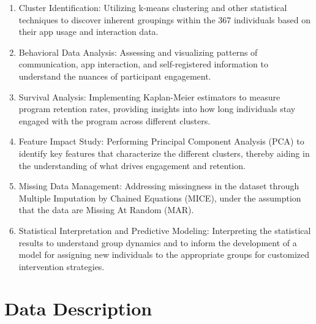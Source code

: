 \documentclass[12pt]{article}
\begin{document}
\begin{enumerate}
  \item Cluster Identification: Utilizing k-means clustering and other statistical techniques to discover inherent groupings within the 367 individuals based on their app usage and interaction data.

  \item Behavioral Data Analysis: Assessing and visualizing patterns of communication, app interaction, and self-registered information to understand the nuances of participant engagement.

  \item Survival Analysis: Implementing Kaplan-Meier estimators to measure program retention rates, providing insights into how long individuals stay engaged with the program across different clusters.

  \item Feature Impact Study: Performing Principal Component Analysis (PCA) to identify key features that characterize the different clusters, thereby aiding in the understanding of what drives engagement and retention.

  \item Missing Data Management: Addressing missingness in the dataset through Multiple Imputation by Chained Equations (MICE), under the assumption that the data are Missing At Random (MAR).

  \item Statistical Interpretation and Predictive Modeling: Interpreting the statistical results to understand group dynamics and to inform the development of a model for assigning new individuals to the appropriate groups for customized intervention strategies.
\end{enumerate}



\section{Data Description}

\label{s.data_desc}

\end{document}

